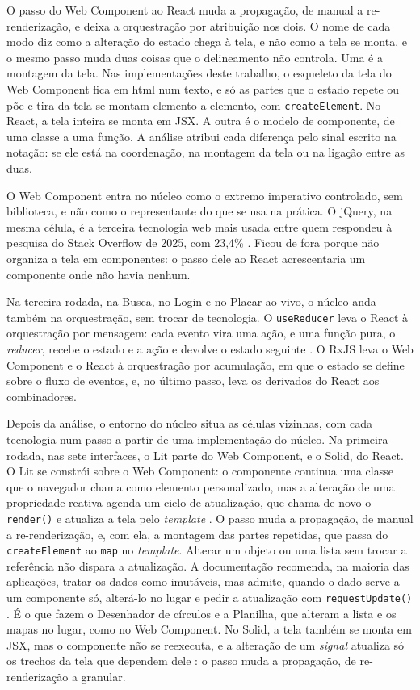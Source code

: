 O passo do Web Component ao React muda a propagação, de manual a
re-renderização, e deixa a orquestração por atribuição nos dois.
O nome de cada modo diz como a alteração do estado chega à tela, e não
como a tela se monta, e o mesmo passo muda duas coisas que o
delineamento não controla.
Uma é a montagem da tela.
Nas implementações deste trabalho, o esqueleto da tela do Web Component
fica em \gls{html} num texto, e só as partes que o estado repete ou põe
e tira da tela se montam elemento a elemento, com \texttt{createElement}.
No React, a tela inteira se monta em JSX.
A outra é o modelo de componente, de uma classe a uma função.
A análise atribui cada diferença pelo sinal escrito na notação: se ele
está na coordenação, na montagem da tela ou na ligação entre as duas.

O Web Component entra no núcleo como o extremo imperativo controlado,
sem biblioteca, e não como o representante do que se usa na prática.
O jQuery, na mesma célula, é a terceira tecnologia web mais usada entre
quem respondeu à pesquisa do Stack Overflow de 2025, com 23,4\%
\cite{stackoverflow2025}.
Ficou de fora porque não organiza a tela em componentes: o passo dele
ao React acrescentaria um componente onde não havia nenhum.

Na terceira rodada, na Busca, no Login e no Placar ao vivo, o núcleo
anda também na orquestração, sem trocar de tecnologia.
O \texttt{useReducer} leva o React à orquestração por mensagem: cada evento
vira uma ação, e uma função pura, o \emph{reducer}, recebe o estado e a ação
e devolve o estado seguinte \cite{meta2026d}.
O RxJS leva o Web Component e o React à orquestração por acumulação, em
que o estado se define sobre o fluxo de eventos, e, no último passo,
leva os derivados do React aos combinadores.

Depois da análise, o entorno do núcleo situa as células vizinhas, com
cada tecnologia num passo a partir de uma implementação do núcleo.
Na primeira rodada, nas sete interfaces, o Lit parte do Web Component,
e o Solid, do React.
O Lit se constrói sobre o Web Component: o componente continua uma
classe que o navegador chama como elemento personalizado, mas a
alteração de uma propriedade reativa agenda um ciclo de atualização,
que chama de novo o \texttt{render()} e atualiza a tela pelo \emph{template}
\cites{google2026d}{google2026e}.
O passo muda a propagação, de manual a re-renderização, e, com ela, a
montagem das partes repetidas, que passa do \texttt{createElement} ao \texttt{map} no
\emph{template}.
Alterar um objeto ou uma lista sem trocar a referência não dispara a
atualização.
A documentação recomenda, na maioria das aplicações, tratar os dados
como imutáveis, mas admite, quando o dado serve a um componente só,
alterá-lo no lugar e pedir a atualização com \texttt{requestUpdate()}
\cite{google2026e}.
É o que fazem o Desenhador de círculos e a Planilha, que alteram a
lista e os mapas no lugar, como no Web Component.
No Solid, a tela também se monta em JSX, mas o componente não se
reexecuta, e a alteração de um \emph{signal} atualiza só os trechos da tela
que dependem dele \cites[][ p. 289:38]{lee2025}{solidjs2026}: o passo
muda a propagação, de re-renderização a granular.


